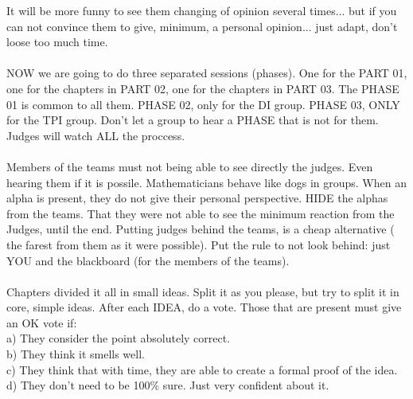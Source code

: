 		\noindent
		It will be more funny to see them changing of opinion several times... but if you can not convince them to give, minimum, a personal opinion... just adapt, don't loose too much time.
		\\\\
		
		\noindent
		NOW we are going to do three separated sessions (phases). One for the PART 01, one for the chapters in PART 02, one for the chapters in PART 03. The PHASE 01 is common to all them. PHASE 02, only for the DI group. PHASE 03, ONLY for the TPI group. Don't let a group to hear a PHASE that is not for them. Judges will watch ALL the proccess.
		\\\\
		
		\noindent
		Members of the teams must not being able to see directly the judges. Even hearing them if it is possile. Mathematicians behave like dogs in groups. When an alpha is present, they do not give their personal perspective. HIDE the alphas from the teams. That they were not able to see the minimum reaction from the Judges, until the end. Putting judges behind the teams, is a cheap alternative ( the farest from them as it were possible). Put the rule to not look behind: just YOU and the blackboard (for the members of the teams).
		\\\\
		
		\noindent
		Chapters divided it all in small ideas. Split it as you please, but try to split it in core, simple ideas. After each IDEA, do a vote. Those that are present must give an OK vote if:\\
		a) They consider the point absolutely correct.\\
		b) They think it smells well.\\
		c) They think that with time, they are able to create a formal proof of the idea.\\
		d) They don't need to be 100\% sure. Just very confident about it.\\
		\\\\
		
